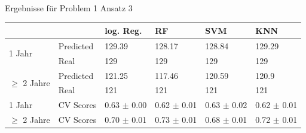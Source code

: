 \documentclass[17pt, fleqn]{beamer}
\begin{document}
\begin{frame}{Ergebnisse für Problem 1 Ansatz 3}
    \scriptsize{
    \begin{table}[ht]
        \begin{tabular}{ p{1.5cm} p{1cm} p{1cm} p{1cm} p{1cm} p{1cm} }
                         &                  & log. Reg.                                  & RF                                         & SVM                                        & KNN                                        \\
          \hline
          \multirow{2}{3em}{1 Jahr}
                         & Predicted        & 129.39                                     & 128.17                                     & 128.84                                     & 129.29                                     \\
                         & Real             & 129                                        & 129                                        & 129                                        & 129                                        \\
      
          \multirow{2}{2.5cm}{$\geq$ 2 Jahre}
                         & Predicted        & 121.25                                     & 117.46                                     & 120.59                                     & 120.9                                      \\
                         & Real             & 121                                        & 121                                        & 121                                        & 121                                        \\
          \hline
          
          1 Jahr         & CV Scores        & 0.63 $\pm$ 0.00                            & 0.62 $\pm$ 0.01                            & 0.63 $\pm$ 0.02                            & 0.62 $\pm$ 0.01                            \\
          $\geq$ 2 Jahre & CV Scores        & 0.70 $\pm$ 0.01                            & 0.73 $\pm$ 0.01                            & 0.68 $\pm$ 0.01                            & 0.72 $\pm$ 0.01                            \\
      
          \hline
        \end{tabular}
      \end{table}
    }
\end{frame}
\end{document}
